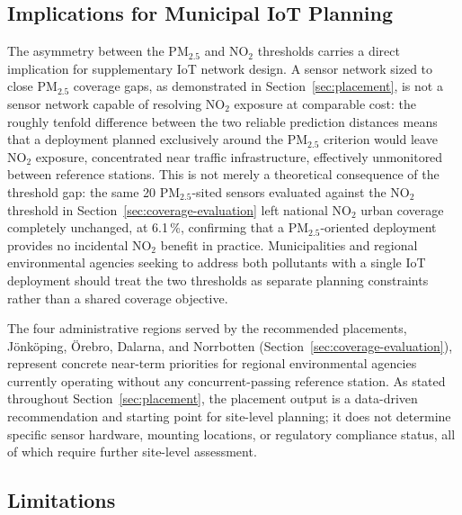 \documentclass[11pt,a4paper]{article}
\let\oldsubsection\subsection
\renewcommand{\subsection}{\FloatBarrier\oldsubsection}
\begin{document}
\subsection{Implications for Municipal IoT Planning}
\label{sec:discussion-implications}

The asymmetry between the PM$_{2.5}$ and NO$_2$ thresholds carries a direct implication for supplementary IoT network design. A sensor network sized to close PM$_{2.5}$ coverage gaps, as demonstrated in Section~\ref{sec:placement}, is not a sensor network capable of resolving NO$_2$ exposure at comparable cost: the roughly tenfold difference between the two reliable prediction distances means that a deployment planned exclusively around the PM$_{2.5}$ criterion would leave NO$_2$ exposure, concentrated near traffic infrastructure, effectively unmonitored between reference stations. This is not merely a theoretical consequence of the threshold gap: the same 20 PM$_{2.5}$-sited sensors evaluated against the NO$_2$ threshold in Section~\ref{sec:coverage-evaluation} left national NO$_2$ urban coverage completely unchanged, at 6.1\,\%, confirming that a PM$_{2.5}$-oriented deployment provides no incidental NO$_2$ benefit in practice. Municipalities and regional environmental agencies seeking to address both pollutants with a single IoT deployment should treat the two thresholds as separate planning constraints rather than a shared coverage objective.

The four administrative regions served by the recommended placements, Jönköping, Örebro, Dalarna, and Norrbotten (Section~\ref{sec:coverage-evaluation}), represent concrete near-term priorities for regional environmental agencies currently operating without any concurrent-passing reference station. As stated throughout Section~\ref{sec:placement}, the placement output is a data-driven recommendation and starting point for site-level planning; it does not determine specific sensor hardware, mounting locations, or regulatory compliance status, all of which require further site-level assessment.

\subsection{Limitations}
\label{sec:discussion-limitations}
\end{document}
